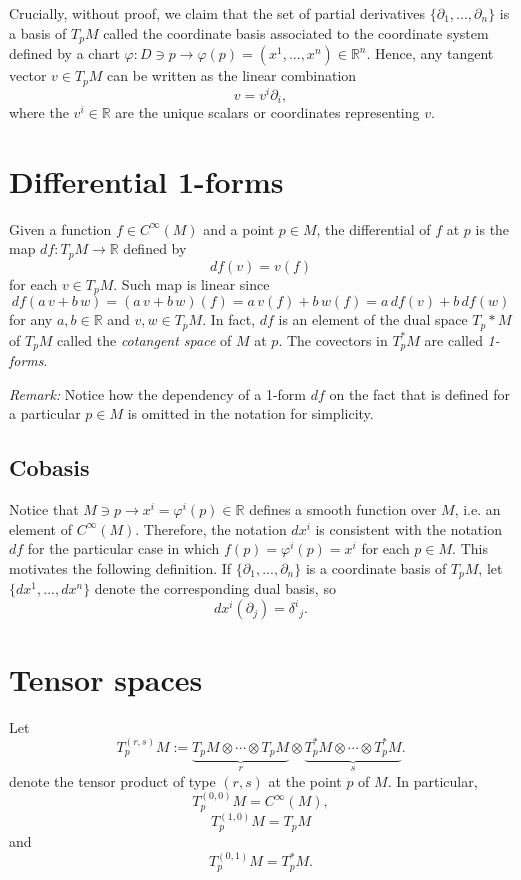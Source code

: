 \documentclass[aps,prl,twocolumn,groupedaddress]{revtex4-2}
\newcommand{\RR}{\mathbb{R}}
\begin{document}
Crucially, without proof, we claim that the set of partial derivatives $\{\partial_1,...,\partial_n\}$ is a basis of $T_pM$ called the coordinate basis associated to the coordinate system defined by a chart $\varphi:D\ni p\to \varphi(p)=(x^1,...,x^n)\in \RR^n$.
Hence, any tangent vector $v\in T_pM$ can be written as the linear combination
$$
v = v^i\partial_i,
$$
where the $v^i\in \RR$ are the unique scalars or coordinates representing $v$.

\section{Differential 1-forms}

Given a function $f\in C^{\infty}(M)$ and a point $p\in M$, the differential of $f$ at $p$ is the map $df:T_pM\to \RR$ defined by
$$
df(v) = v(f)
$$
for each $v\in T_pM$.
Such map is linear since
$$
df(a\,v+b\,w)
=
(a\,v+b\,w)(f)
=
a\,v(f)+b\,w(f)
=
a\,df(v)
+
b\,df(w)
$$
for any $a,b\in \RR$ and $v,w\in T_pM$.
In fact, $df$ is an element of the dual space $T_p*M$ of $T_pM$ called the {\em cotangent space} of $M$ at $p$.
The covectors in $T_p^*M$ are called {\em 1-forms}.

{\em Remark:} Notice how the dependency of a 1-form $df$ on the fact that is defined for a particular $p\in M$ is omitted in the notation for simplicity.

\subsection{Cobasis}

Notice that $M\ni p\to x^i=\varphi^i(p)\in \RR$ defines a smooth function over $M$, i.e. an element of $C^{\infty}(M)$.
Therefore, the notation $dx^i$ is consistent with the notation $df$ for the particular case in which $f(p)=\varphi^i(p)=x^i$ for each $p\in M$.
This motivates the following definition.
If $\{\partial_1,...,\partial_n\}$ is a coordinate basis of $T_pM$, let $\{dx^1,...,dx^n\}$ denote the corresponding dual basis, so
$$
dx^i(\partial_j)
=
\delta^i{}_j.
$$

\section{Tensor spaces}

Let
$$
\boxed{
T_p^{(r,s)}M
:=
\underbrace{T_pM\otimes\cdots\otimes T_pM}_{r}
\otimes
\underbrace{T_p^*M\otimes\cdots\otimes T_p^*M}_{s}.
}
$$
denote the tensor product of type $(r,s)$ at the point $p$ of $M$.
In particular, 
$$
T^{(0,0)}_pM=C^{\infty}(M),
$$
$$
T^{(1,0)}_pM=T_pM
$$
and
$$
T^{(0,1)}_pM=T_p^*M.
$$
\end{document}
